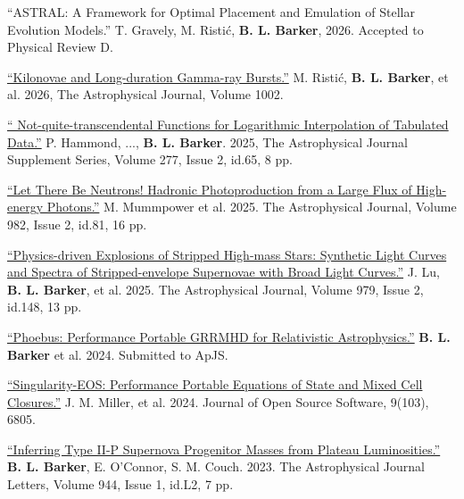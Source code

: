 \documentclass[11pt]{vitae}
\begin{document}
\begin{publist}

\item ``ASTRAL: A Framework for Optimal Placement and Emulation of Stellar Evolution Models.'' T. Gravely, M. Risti\'c, \textbf{B. L. Barker}, 2026. Accepted to Physical Review D.

\item \href{https://ui.adsabs.harvard.edu/abs/2025arXiv250903003R/abstract}{``Kilonovae and Long-duration Gamma-ray Bursts.''} M. Risti\'c, \textbf{B. L. Barker}, et al. 2026, The Astrophysical Journal, Volume 1002.

\item \href{https://ui.adsabs.harvard.edu/abs/2025ApJS..277...65H/abstract}{`` Not-quite-transcendental Functions for Logarithmic Interpolation of Tabulated Data.''} P. Hammond, ..., \textbf{B. L. Barker}. 2025, The Astrophysical Journal Supplement Series, Volume 277, Issue 2, id.65, 8 pp.

\item \href{https://ui.adsabs.harvard.edu/abs/2025ApJ...982...81M/abstract}{``Let There Be Neutrons! Hadronic Photoproduction from a Large Flux of High-energy Photons.''} M. Mummpower et al. 2025. The Astrophysical Journal, Volume 982, Issue 2, id.81, 16 pp.

\item \href{https://ui.adsabs.harvard.edu/abs/2025ApJ...979..148L/abstract}{``Physics-driven Explosions of Stripped High-mass Stars: Synthetic Light Curves and Spectra of Stripped-envelope Supernovae with Broad Light Curves.''} J. Lu, \textbf{B. L. Barker}, et al. 2025. The Astrophysical Journal, Volume 979, Issue 2, id.148, 13 pp.

\item \href{https://ui.adsabs.harvard.edu/abs/2024arXiv241009146B/abstract}{``Phoebus: Performance Portable GRRMHD for Relativistic Astrophysics.''} \textbf{B. L. Barker} et al. 2024. Submitted to ApJS.

\item \href{https://joss.theoj.org/papers/10.21105/joss.06805}{``Singularity-EOS: Performance Portable Equations of State and Mixed Cell Closures.''} J. M. Miller, et al. 2024. Journal of Open Source Software, 9(103), 6805.

\item \href{https://doi.org/10.48550/arXiv.2211.05789}{``Inferring Type II-P Supernova Progenitor Masses from Plateau Luminosities.''} \textbf{B. L. Barker}, E. O'Connor, S. M. Couch. 2023. The Astrophysical Journal Letters, Volume 944, Issue 1, id.L2, 7 pp.


\end{publist}
\end{document}
